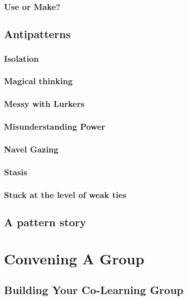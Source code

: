 \documentclass[ebook, 12pt, twoside]{memoir}
\begin{document}
\section*{Use or Make?}



\chapter[\textbf{Antipatterns}]{Antipatterns}

\section*{Isolation}

\section*{Magical thinking}

\section*{Messy with Lurkers}

\section*{Misunderstanding Power}

\section*{Navel Gazing}

\section*{Stasis}

\section*{Stuck at the level of weak ties}


\chapter[\textbf{A pattern story}]{A pattern story}
%



\part{Convening A Group} %
%
\chapter[\textbf{Convening}]{Building Your Co-Learning Group}

%
\end{document}
